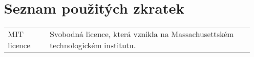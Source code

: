 \section*{Seznam použitých zkratek}
\begin{tabularx}{\textwidth}{l X}
MIT licence          & Svobodná licence, která vznikla na Massachusettském technologickém institutu.
\end{tabularx}
